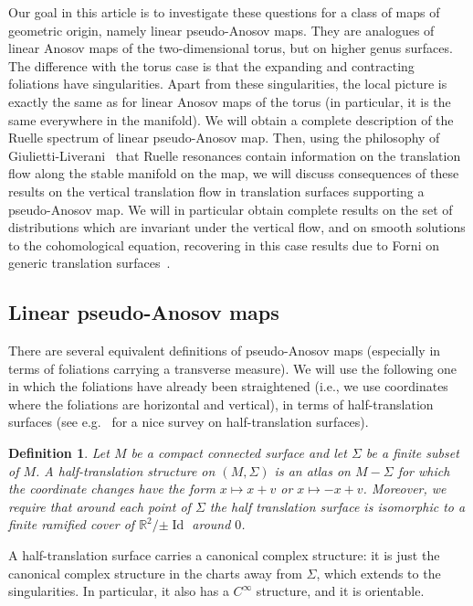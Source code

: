 \documentclass[11pt, a4paper, oneside, final, pagebackref]{amsart}
\newcommand{\R}{\mathbb{R}}
\DeclareMathOperator{\Id}{Id}
\newtheorem{definition}[thm]{Definition}
\theoremstyle{definition}
\numberwithin{equation}{section}
\begin{document}
Our goal in this article is to investigate these questions for a class of
maps of geometric origin, namely linear pseudo-Anosov maps. They are analogues of
linear Anosov maps of the two-dimensional torus, but on higher genus
surfaces. The difference with the torus case is that the expanding and
contracting foliations have singularities. Apart from these singularities,
the local picture is exactly the same as for linear Anosov maps of the torus
(in particular, it is the same everywhere in the manifold). We will obtain a
complete description of the Ruelle spectrum of linear pseudo-Anosov map.
Then, using the philosophy of Giulietti-Liverani~\cite{giulietti_liverani}
that Ruelle resonances contain information on the translation flow along the
stable manifold on the map, we will discuss consequences of these results on
the vertical translation flow in translation surfaces supporting a
pseudo-Anosov map. We will in particular obtain complete results on the set
of distributions which are invariant under the vertical flow, and on smooth
solutions to the cohomological equation, recovering in this case results due
to Forni on generic translation surfaces~\cite{forni_cohomological,
forni_deviation, forni_regularity}.

\subsection*{Linear pseudo-Anosov maps}
There are several equivalent definitions of pseudo-Anosov maps (especially in
terms of foliations carrying a transverse measure). We will use the following
one in which the foliations have already been straightened (i.e., we use
coordinates where the foliations are horizontal and vertical), in terms of
half-translation surfaces (see e.g.~\cite{zorich} for a nice survey on half-translation surfaces).

\begin{definition}
\label{def:half_translation} Let $M$ be a compact connected surface and let
$\Sigma$ be a finite subset of $M$. A half-translation structure on
$(M,\Sigma)$ is an atlas on $M-\Sigma$ for which the coordinate changes have
the form $x \mapsto x+v$ or $x \mapsto -x+v$. Moreover, we require that
around each point of $\Sigma$ the half translation surface is isomorphic to a
finite ramified cover of $\R^2/{\pm \Id}$ around $0$.
\end{definition}
A half-translation surface carries a canonical complex structure: it is just
the canonical complex structure in the charts away from $\Sigma$, which
extends to the singularities. In particular, it also has a $C^\infty$
structure, and it is orientable.
\end{document}
